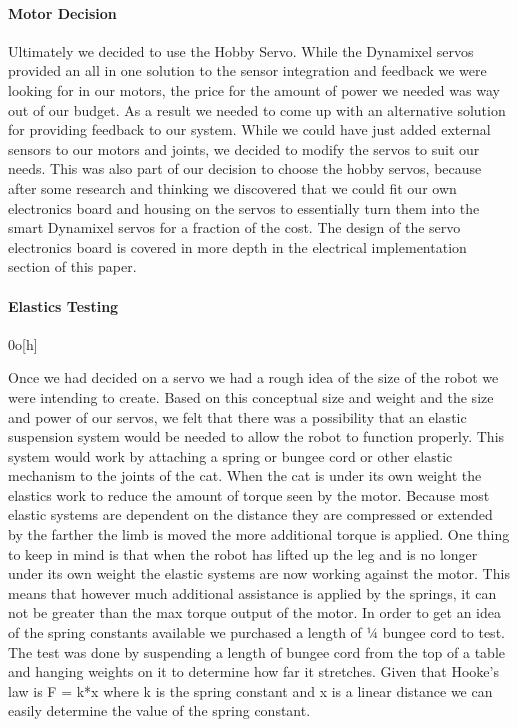             \paragraph{Motor Decision}
                Ultimately we decided to use the Hobby Servo. While the Dynamixel servos provided an all in one solution to the sensor integration and feedback we were looking for in our motors, the price for the amount of power we needed was way out of our budget. As a result we needed to come up with an alternative solution for providing feedback to our system. While we could have just added external sensors to our motors and joints, we decided to modify the servos to suit our needs. This was also part of our decision to choose the hobby servos, because after some research and thinking we discovered that we could fit our own electronics board and housing on the servos to essentially turn them into the smart Dynamixel servos for a fraction of the cost. The design of the servo electronics board is covered in more depth in the electrical implementation section of this paper.
                
            \paragraph{Elastics Testing} 0o[h]

                Once we had decided on a servo we had a rough idea of the size of the robot we were intending to create. Based on this conceptual size and weight and the size and power of our servos,  we felt that there was a possibility that an elastic suspension system would be needed to allow the robot to function properly. This system would work by attaching a spring or bungee cord or other elastic mechanism to the joints of the cat. When the cat is under its own weight the elastics work to reduce the amount of torque seen by the motor. Because most elastic systems are dependent on the distance they are compressed or extended by the farther the limb is moved the more additional torque is applied. One thing to keep in mind is that when the robot has lifted up the leg and is no longer under its own weight the elastic systems are now working against the motor. This means that however much additional assistance is applied by the springs, it can not be greater than the max torque output of the motor.  In order to get an idea of the spring constants available we purchased a length of ¼ bungee cord to test. The test was done by suspending a length of bungee cord from the top of a table and hanging weights on it to determine how far it stretches.  Given that Hooke's law is F = k*x where k is the spring constant and x is a linear distance we can easily determine the value of the spring constant. 
	
